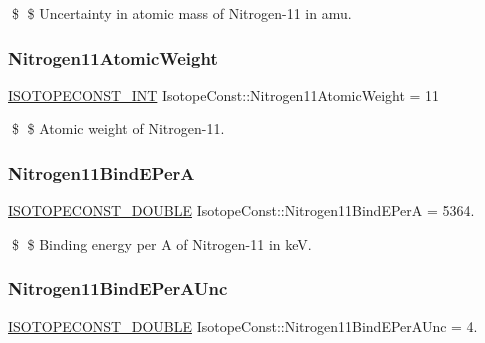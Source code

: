 \$ \$ Uncertainty in atomic mass of Nitrogen-\/11 in amu. \mbox{\label{group___isotope_const-_nitrogen-_n11_ga3209400000bbe223c43f45a0e008fff5}} 
\subsubsection{\texorpdfstring{Nitrogen11\+Atomic\+Weight}{Nitrogen11AtomicWeight}}
{\footnotesize\ttfamily \mbox{\hyperlink{group___isotope_const-_macros_ga5f18360b3e99483a35c32d789e62621c}{I\+S\+O\+T\+O\+P\+E\+C\+O\+N\+S\+T\+\_\+\+I\+NT}} Isotope\+Const\+::\+Nitrogen11\+Atomic\+Weight = 11}

\$ \$ Atomic weight of Nitrogen-\/11. \mbox{\label{group___isotope_const-_nitrogen-_n11_ga375a16c1f6c60fa14e84d6eca36a6df6}} 
\subsubsection{\texorpdfstring{Nitrogen11\+Bind\+E\+PerA}{Nitrogen11BindEPerA}}
{\footnotesize\ttfamily \mbox{\hyperlink{group___isotope_const-_macros_ga8f45a7272ce02c0b4c65c44636ed719a}{I\+S\+O\+T\+O\+P\+E\+C\+O\+N\+S\+T\+\_\+\+D\+O\+U\+B\+LE}} Isotope\+Const\+::\+Nitrogen11\+Bind\+E\+PerA = 5364.}

\$ \$ Binding energy per A of Nitrogen-\/11 in keV. \mbox{\label{group___isotope_const-_nitrogen-_n11_ga7be0d21808ac6f1483ddac420951eff2}} 
\subsubsection{\texorpdfstring{Nitrogen11\+Bind\+E\+Per\+A\+Unc}{Nitrogen11BindEPerAUnc}}
{\footnotesize\ttfamily \mbox{\hyperlink{group___isotope_const-_macros_ga8f45a7272ce02c0b4c65c44636ed719a}{I\+S\+O\+T\+O\+P\+E\+C\+O\+N\+S\+T\+\_\+\+D\+O\+U\+B\+LE}} Isotope\+Const\+::\+Nitrogen11\+Bind\+E\+Per\+A\+Unc = 4.}

